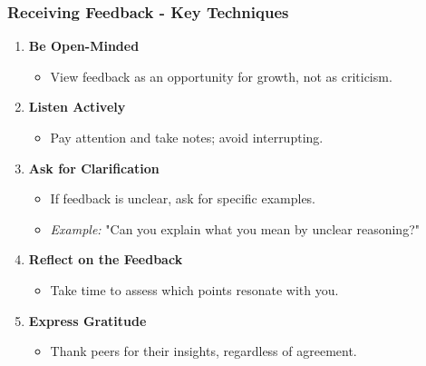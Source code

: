 \documentclass[aspectratio=169]{beamer}
\begin{document}
\begin{frame}[fragile]
    \frametitle{Receiving Feedback - Key Techniques}
    \begin{enumerate}
        \item \textbf{Be Open-Minded}
            \begin{itemize}
                \item View feedback as an opportunity for growth, not as criticism.
            \end{itemize}
        \item \textbf{Listen Actively}
            \begin{itemize}
                \item Pay attention and take notes; avoid interrupting.
            \end{itemize}
        \item \textbf{Ask for Clarification}
            \begin{itemize}
                \item If feedback is unclear, ask for specific examples.
                \item \textit{Example:} "Can you explain what you mean by unclear reasoning?"
            \end{itemize}
        \item \textbf{Reflect on the Feedback}
            \begin{itemize}
                \item Take time to assess which points resonate with you.
            \end{itemize}
        \item \textbf{Express Gratitude}
            \begin{itemize}
                \item Thank peers for their insights, regardless of agreement.
            \end{itemize}
    \end{enumerate}
\end{frame}
\end{document}
